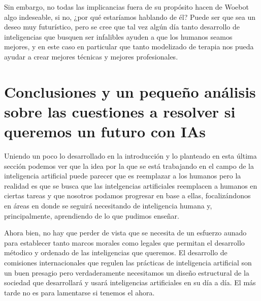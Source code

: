 \documentclass[11pt]{article}
\begin{document}
Sin embargo, no todas las implicancias fuera de su propósito
hacen de Woebot algo indeseable, si no, ¿por qué estaríamos 
hablando de él? Puede ser que sea un deseo muy futurístico,
pero se cree que tal vez algún día tanto desarrollo de 
inteligencias que busquen ser infalibles ayuden a que los
humanos seamos mejores, y en este caso en particular que 
tanto modelizado de terapia nos pueda ayudar a crear 
mejores técnicas y mejores profesionales.


\section{Conclusiones y un pequeño análisis sobre las cuestiones a resolver si queremos un futuro con IAs}
Uniendo un poco lo desarrollado en la introducción y
lo planteado en esta última sección podemos ver que la 
idea por la que se está trabajando en el campo de la 
inteligencia artificial puede parecer que es 
reemplazar a los humanos pero la realidad es que se busca
que las intelgencias artificiales reemplacen a humanos en 
ciertas tareas y que nosotros podamos progresar en base a 
ellas, focalizándonos en áreas en donde se seguirá 
necesitando de inteligencia humana y, principalmente, 
aprendiendo de lo que pudimos enseñar.

Ahora bien, no hay que perder de vista que se necesita 
de un esfuerzo aunado para establecer
tanto marcos morales como legales que permitan el desarrollo 
métodico y ordenado
de las inteligencias que queremos. El desarrollo de 
comisiones internacionales que regulen las 
prácticas de inteligencia artificial son un buen presagio 
pero verdaderamente necesitamos un diseño estructural 
de la sociedad que desarrollará y usará inteligencias 
artificiales en su día a día. El más tarde no es
para lamentarse si tenemos el ahora.


\end{document}
